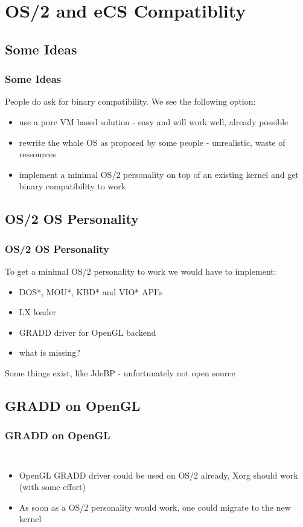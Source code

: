 \documentclass{beamer}
\begin{document}
\section{OS/2 and eCS Compatiblity}
\subsection{Some Ideas}
\begin{frame}
\frametitle{Some Ideas}
People do ask for binary compatibility. We see the following option:
\begin{itemize}
  \item use a pure VM based solution - easy and will work well, already possible
  \item rewrite the whole OS as proposed by some people - unrealistic, waste of ressources
  \item implement a minimal OS/2 personality on top of an existing kernel and get binary compatibility to work
\end{itemize}
\end{frame}

\subsection{OS/2 OS Personality}
\begin{frame}
\frametitle{OS/2 OS Personality}
To get a minimal OS/2 personality to work we would have to implement:
\begin{itemize}
  \item DOS*, MOU*, KBD* and VIO* API's
  \item LX loader
  \item GRADD driver for OpenGL backend
  \item what is missing?
\end{itemize}
Some things exist, like JdeBP - unfortunately not open source
\end{frame}

\subsection{GRADD on OpenGL}
\begin{frame}
\frametitle{GRADD on OpenGL}
\begin{columns}
\column{3cm}
\column{6cm}
\begin{itemize}
  \item OpenGL GRADD driver could be  used on OS/2 already, Xorg should work (with some effort)
  \item As soon as a OS/2 personality would work, one could migrate to the new kernel
\end{itemize}
\end{columns}
\end{frame}
\end{document}
